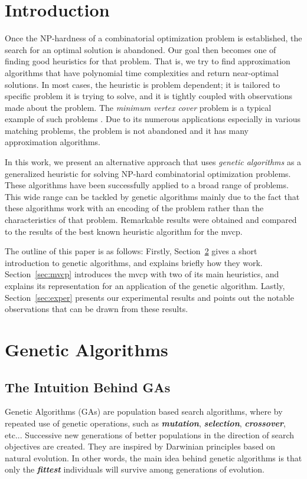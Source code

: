 \documentclass[12pt]{article}
\newcommand{\textem}[1]{\textbf{\emph{#1}}}
\begin{document}
\pagebreak



\section{Introduction}
\label{sec:intro}
Once the NP-hardness of a combinatorial optimization
problem is established, the search for an optimal solution
is abandoned.
Our goal then becomes one of finding good heuristics
for that problem.
That is, we try to find approximation algorithms
that have polynomial time complexities and return near-optimal
solutions.
In most cases, the heuristic is problem dependent; it is tailored to specific problem
it is trying to solve, and it is tightly coupled with observations made about the problem.
The \textit{minimum vertex cover} problem is a typical example of such
problems \cite{wolfram:mvc}.
Due to its numerous applications especially in various
matching problems, the problem is not abandoned and it has many
approximation algorithms.

In this work, we present an alternative approach that
uses \textit{genetic algorithms} as a generalized heuristic for
solving NP-hard combinatorial optimization problems.
These algorithms have been successfully applied to a broad
range of problems.
This wide range can be tackled by genetic algorithms
mainly due to the fact that these algorithms work with an
encoding of the problem rather than the characteristics
of that problem.
Remarkable results were obtained and compared to the results of the
best known heuristic algorithm for the mvcp.

The outline of this paper is as follows: Firstly, Section~\ref{sec:ga} gives a
short introduction to genetic algorithms, and explains briefly how they work.
Section~\ref{sec:mvcp} introduces the mvcp with two of its main heuristics,
and explains its representation for an application of the genetic algorithm.
Lastly, Section~\ref{sec:exper} presents our experimental results and
points out the notable observations that can be drawn from these results.



\section{Genetic Algorithms}
\label{sec:ga}
\subsection{The Intuition Behind GAs}
Genetic Algorithms (GAs) \cite{coley, goldberg} are population based
search algorithms, where by repeated use of genetic operations,
such as \textem{mutation}, \textem{selection}, \textem{crossover}, etc...
Successive new generations of better populations in the direction of
search objectives are created.
They are inspired by Darwinian principles
based on natural evolution.
In other words, the main idea behind genetic
algorithms is that only the \textem{fittest} individuals will survive
among generations of evolution.
\end{document}

